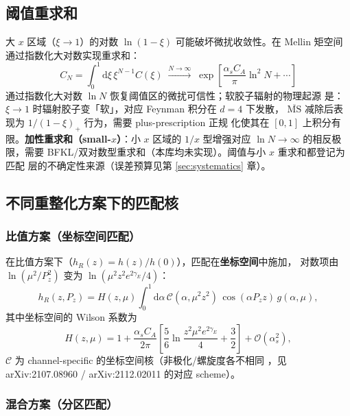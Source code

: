 \documentclass[11pt,a4paper]{ctexart}
\newcommand{\MSbarM}{\overline{\text{MS}}}
\newcommand{\order}[1]{\mathcal{O}(#1)}
\begin{document}
\subsection{阈值重求和}

大 $x$ 区域（$\xi\to1$）的对数 $\ln(1-\xi)$ 可能破坏微扰收敛性。在
Mellin 矩空间通过指数化大对数实现重求和：
\begin{equation}
C_N = \int_0^1 \mathrm{d}\xi \, \xi^{N-1} C(\xi)
\;\xrightarrow{N \to \infty}\;
\exp\!\left[ \frac{\alpha_s C_A}{\pi} \ln^2 N + \cdots \right]
\end{equation}
通过指数化大对数 $\ln N$ 恢复阈值区的微扰可信性；软胶子辐射的物理起源
是：$\xi\to1$ 时辐射胶子变「软」，对应 Feynman 积分在 $d=4$ 下发散，
$\MSbarM$ 减除后表现为 $1/(1-\xi)_+$ 行为，需要 plus-prescription 正规
化使其在 $[0,1]$ 上积分有限。\textbf{加性重求和（small-$x$）}：小
$x$ 区域的 $1/x$ 型增强对应 $\ln N\to\infty$ 的相反极限，需要
BFKL/双对数型重求和（本库均未实现）。阈值与小 $x$ 重求和都登记为匹配
层的不确定性来源（误差预算见第 \ref{sec:systematics} 章）。

\subsection{不同重整化方案下的匹配核}

\subsubsection{比值方案（坐标空间匹配）}

在比值方案下（$h_R(z)=h(z)/h(0)$），匹配在\textbf{坐标空间}中施加，
对数项由 $\ln(\mu^2/P_z^2)$ 变为 $\ln(\mu^2z^2e^{2\gamma_E}/4)$：
\begin{equation}
h_R(z, P_z) = H(z, \mu) \int_0^1 \mathrm{d}\alpha \,
\mathcal{C}(\alpha, \mu^2 z^2) \, \cos(\alpha P_z z)\, g(\alpha, \mu),
\end{equation}
其中坐标空间的 Wilson 系数为
\begin{equation}\label{eq:H-coordinate}
H(z, \mu) = 1 + \frac{\alpha_s C_A}{2\pi}
\left[ \frac{5}{6}\ln\!\frac{z^2\mu^2 e^{2\gamma_E}}{4} + \frac{3}{2}
\right] + \order{\alpha_s^2},
\end{equation}
$\mathcal C$ 为 channel-specific 的坐标空间核（非极化/螺旋度各不相同
，见 arXiv:2107.08960 / arXiv:2112.02011 的对应 scheme）。

\subsubsection{混合方案（分区匹配）}
\end{document}
